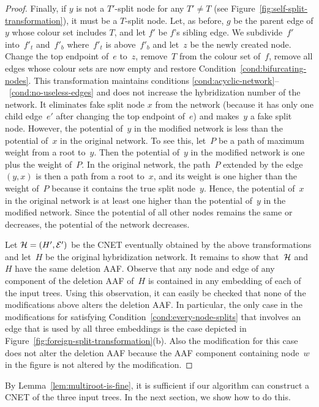\begin{proof}
  Finally, if $y$ is not a $T'$-split node for any $T' \ne T$ (see   Figure~\ref{fig:self-split-transformation}), it must be a   $T$-split node. Let, as before, $g$ be the   parent edge of $y$ whose colour set includes $T$, and let $f'$ be $f$'s   sibling edge. We subdivide~$f'$ into~$f'_t$ and~$f'_b$ where~$f'_t$ is above~$f'_b$ and let~$z$ be the newly created node. Change the top endpoint of~$e$ to~$z$, remove~$T$ from the colour set of~$f$, remove all edges whose colour sets are now empty and restore Condition~\ref{cond:bifurcating-nodes}. This transformation maintains conditions   \ref{cond:acyclic-network}--~\ref{cond:no-useless-edges} and does not   increase the hybridization number of the network.   It eliminates fake split node $x$ from the network (because it has only one child edge~{$e'$} after   changing the top endpoint of~{$e$}) and makes~$y$ a fake split node.   However, the potential of~$y$ in the modified network is less than the potential of~$x$ in the original network. To see this, let~$P$ be a path of maximum weight from a root to~$y$. Then the potential of~$y$ in the modified network is one plus the weight of~$P$. In the original network, the path~$P$ extended by the edge~$(y,x)$ is then a path from a root to~$x$, and its weight is one higher than the weight of~$P$ {because it contains the true split node~$y$}. Hence, the potential of~$x$ in the original network is at least one higher than the potential of~$y$ in the modified network. Since the potential of all other nodes remains the same or decreases, the potential of the network decreases.
  
  Let $\mathcal{H} = (H', \mathcal{E}')$ be the CNET eventually obtained by the above transformations and let~$H$ be the original hybridization network. It remains to show that~$\mathcal{H}$ and~$H$ have the same deletion AAF. Observe that any node and edge of any component of the deletion AAF of~$H$ is contained in any embedding of each of the input trees. Using this observation, it can easily be checked that none of the modifications above alters the deletion AAF. In particular, the only case in the modifications for satisfying Condition~\ref{cond:every-node-splits} that involves an edge that is used by all three embeddings is the case depicted in Figure~\ref{fig:foreign-split-transformation}(b). Also the modification for this case does not alter the deletion AAF because the AAF component containing node~$w$ in the figure is not altered by the modification.
\end{proof}

By Lemma~\ref{lem:multiroot-is-fine}, it is sufficient if our algorithm can construct a CNET of the three input trees. In the next section, we show how to do this. 




